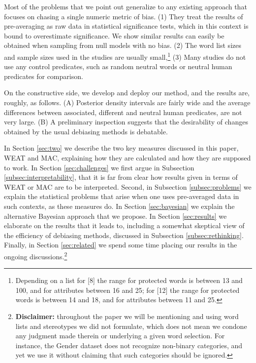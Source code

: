 \documentclass[
  12pt,
  dvipsnames,enabledeprecatedfontcommands]{scrartcl}
\begin{document}
Most of the problems that we point out generalize to any existing
approach that focuses on chasing a single numeric metric of bias. (1)
They treat the results of pre-averaging as raw data in statistical
significance tests, which in this context is bound to overestimate
significance. We show similar results can easily be obtained when
sampling from null models with no bias. (2) The word list sizes and
sample sizes used in the studies are usually small,\footnote{Depending
  on a list for {[}8{]} the range for protected words is between 13 and
  100, and for attributes between 16 and 25; for {[}12{]} the range for
  protected words is between 14 and 18, and for attributes between 11
  and 25.} (3) Many studies do not use any control predicates, such as
random neutral words or neutral human predicates for comparison.

On the constructive side, we develop and deploy our method, and the
results are, roughly, as follows. (A) Posterior density intervals are
fairly wide and the average differences between associated, different
and neutral human predicates, are not very large. (B) A preliminary
inspection suggests that the desirability of changes obtained by the
usual debiasing methods is debatable.

In Section \ref{sec:two} we describe the two key measures discussed in
this paper, \textsf{WEAT} and \textsf{MAC}, explaining how they are
calculated and how they are supposed to work. In Section
\ref{sec:challenges} we first argue in Subsection
\ref{subsec:interpretability}, that it is far from clear how results
given in terms of \textsf{WEAT} or \textsf{MAC} are to be interpreted.
Second, in Subsection \ref{subsec:problems} we explain the statistical
problems that arise when one uses pre-averaged data in such contexts, as
these measures do. In Section \ref{sec:bayesian} we explain the
alternative Bayesian approach that we propose. In Section
\ref{sec:results} we elaborate on the results that it leads to,
including a somewhat skeptical view of the efficiency of debiasing
methods, discussed in Subsection \ref{subsec:rethinking}. Finally, in
Section \ref{sec:related} we spend some time placing our results in the
ongoing discussions.\footnote{\textbf{Disclaimer:} throughout the paper
  we will be mentioning and using word lists and stereotypes we did not
  formulate, which does not mean we condone any judgment made therein or
  underlying a given word selection. For instance, the Gender dataset
  does not recognize non-binary categories, and yet we use it without
  claiming that such categories should be ignored.}
\end{document}
